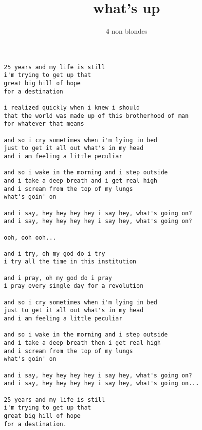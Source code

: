\author{4 non blondes}
\title{what's up}
\maketitle
\begin{verbatim}
25 years and my life is still
i'm trying to get up that
great big hill of hope
for a destination

i realized quickly when i knew i should
that the world was made up of this brotherhood of man
for whatever that means

and so i cry sometimes when i'm lying in bed
just to get it all out what's in my head
and i am feeling a little peculiar

and so i wake in the morning and i step outside
and i take a deep breath and i get real high
and i scream from the top of my lungs
what's goin' on

and i say, hey hey hey hey i say hey, what's going on?
and i say, hey hey hey hey i say hey, what's going on?

ooh, ooh ooh...

and i try, oh my god do i try
i try all the time in this institution

and i pray, oh my god do i pray
i pray every single day for a revolution

and so i cry sometimes when i'm lying in bed
just to get it all out what's in my head
and i am feeling a little peculiar

and so i wake in the morning and i step outside
and i take a deep breath then i get real high
and i scream from the top of my lungs
what's goin' on

and i say, hey hey hey hey i say hey, what's going on?
and i say, hey hey hey hey i say hey, what's going on...

25 years and my life is still
i'm trying to get up that
great big hill of hope
for a destination.
\end{verbatim}